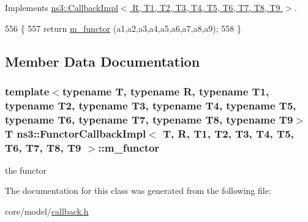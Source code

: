 Implements \hyperlink{classns3_1_1CallbackImpl_a17d295d897fe07ffced2f5b2d413f80b}{ns3\+::\+Callback\+Impl$<$ R, T1, T2, T3, T4, T5, T6, T7, T8, T9 $>$}.


\begin{DoxyCode}
556                                                                        \{
557     \textcolor{keywordflow}{return} \hyperlink{classns3_1_1FunctorCallbackImpl_a3ad6ca16055186688d0945575ab56743}{m\_functor} (a1,a2,a3,a4,a5,a6,a7,a8,a9);
558   \}
\end{DoxyCode}


\subsection{Member Data Documentation}
\subsubsection[{\texorpdfstring{m\+\_\+functor}{m_functor}}]{\setlength{\rightskip}{0pt plus 5cm}template$<$typename T, typename R, typename T1, typename T2, typename T3, typename T4, typename T5, typename T6, typename T7, typename T8, typename T9$>$ T {\bf ns3\+::\+Functor\+Callback\+Impl}$<$ T, R, T1, T2, T3, T4, T5, T6, T7, T8, T9 $>$\+::m\+\_\+functor\hspace{0.3cm}{\ttfamily [private]}}\hypertarget{classns3_1_1FunctorCallbackImpl_a3ad6ca16055186688d0945575ab56743}{}\label{classns3_1_1FunctorCallbackImpl_a3ad6ca16055186688d0945575ab56743}


the functor 



The documentation for this class was generated from the following file\+:\begin{DoxyCompactItemize}
\item 
core/model/\hyperlink{callback_8h}{callback.\+h}\end{DoxyCompactItemize}
